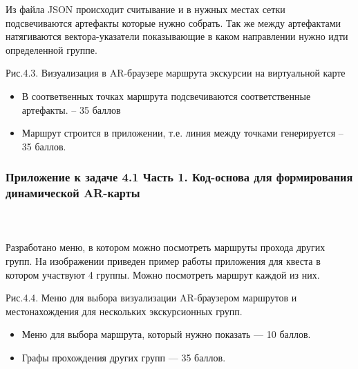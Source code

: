 Из файла JSON происходит считывание и в нужных местах сетки подсвечиваются артефакты которые нужно собрать. Так же между артефактами натягиваются вектора-указатели показывающие в каком направлении нужно идти определенной группе.

 
\begin{center}
    Рис.4.3. Визуализация в AR-браузере маршрута экскурсии на виртуальной карте
\end{center}

\markSection

\begin{itemize}
    \item	В соответвенных точках маршрута подсвечиваются соответственные 
артефакты. – 35 баллов
    \item	Маршрут строится в приложении, т.е. линия между точками 
генерируется – 35 баллов.
\end{itemize}

\subsubsection*{Приложение к задаче 4.1 Часть 1. Код-основа для формирования динамической AR-карты}

\inputminted[fontsize=\footnotesize, linenos]{csharp}{final/command_tour/ar/task_04/source1-1.cs}
\inputminted[fontsize=\footnotesize, linenos]{csharp}{final/command_tour/ar/task_04/source1-2.cs}
\inputminted[fontsize=\footnotesize, linenos]{csharp}{final/command_tour/ar/task_04/source1-3.cs}

Разработано меню, в котором можно посмотреть маршруты прохода других групп. На изображении приведен пример работы приложения для квеста в котором участвуют 4 группы. Можно посмотреть маршрут каждой из них.


\begin{center}
Рис.4.4. Меню для выбора визуализации AR-браузером маршрутов и местонахождения для нескольких экскурсионных групп. 
\end{center}

\markSection

\begin{itemize}
\item Меню для выбора маршрута, который нужно показать — 10 баллов.
\item Графы прохождения других групп — 35 баллов.
\end{itemize}
